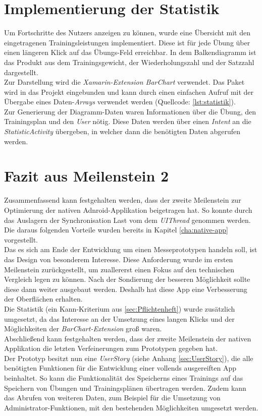 \section{Implementierung der Statistik}
\label{sec:implementierung-statistik}
Um Fortschritte des Nutzers anzeigen zu können, wurde eine Übersicht mit den eingetragenen Trainingsleistungen implementiert. Diese ist für jede Übung über einen längeren Klick auf das Übungs-Feld erreichbar. In dem Balkendiagramm ist das Produkt aus dem Trainingsgewicht, der Wiederholungszahl und der Satzzahl dargestellt.\\
Zur Darstellung wird die \textit{Xamarin-Extension BarChart} verwendet. Das Paket wird in das Projekt eingebunden und kann durch einen einfachen Aufruf mit der Übergabe eines Daten-\textit{Arrays} verwendet werden (Quellcode: \ref{lst:statistik}).\\
Zur Generierung der Diagramm-Daten waren Informationen über die Übung, den Trainingsplan und den \textit{User} nötig. Diese Daten werden über einen \textit{Intent} an die \textit{StatisticActivity} übergeben, in welcher dann die benötigten Daten abgerufen werden.


\section{Fazit aus Meilenstein 2}
\label{sec:fazit-meilenstein-2}
Zusammenfassend kann festgehalten werden, dass der zweite Meilenstein zur Optimierung der nativen Adnroid-Applikation beigetragen hat. So konnte durch das Auslagern der Synchronisation Last vom dem \textit{UIThread} genommen werden. Die daraus folgenden Vorteile wurden bereits in Kapitel \ref{cha:native-app} vorgestellt.\\
Das es sich am Ende der Entwicklung um einen Messeprototypen handeln soll, ist das Design von besonderem Interesse. Diese Anforderung wurde im ersten Meilenstein zurückgestellt, um zuallererst einen Fokus auf den technischen Vergleich legen zu können. Nach der Sondierung der besseren Möglichkeit sollte diese dann weiter ausgebaut werden. Deshalb hat diese App eine Verbesserung der Oberflächen erhalten.\\
Die Statistik (ein Kann-Kriterium aus \ref{sec:Pflichtenheft}) wurde zusätzlich umgesetzt, da das Interesse an der Umsetzung eines langen Klicks und der Möglichkeiten der \textit{BarChart-Extension} groß waren.\\
Abschließend kann festgehalten werden, dass der zweite Meilenstein der nativen Applikation die letzten Verfeinerungen zum Prototypen gegeben hat.\\
Der Prototyp besitzt nun eine \textit{UserStory} (siehe Anhang \ref{sec:UserStory}), die alle benötigten Funktionen für die Entwicklung einer vollends ausgereiften App beinhaltet. So kann die Funktionalität des Speicherns eines Trainings auf das Speichern von Übungen und Trainingsplänen übertragen werden. Zudem kann das Abrufen von weiteren Daten, zum Beispiel für die Umsetzung von Administrator-Funktionen, mit den bestehenden Möglichkeiten umgesetzt werden.